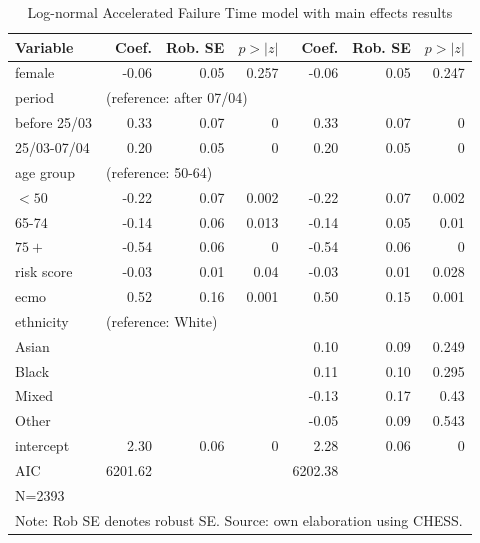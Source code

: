 \documentclass[review]{elsarticle}
\begin{document}
\begin{table}[htp]
\caption{Log-normal Accelerated Failure Time model with main effects results  \label{Table:ethnicity_model} }
\centering
\begin{tabular}{lrrr|rrr}\toprule
Variable	&	Coef.	&	Rob. SE	&			$p>|z|$	&	Coef.	&	Rob. SE	&			$p>|z|$	\\\toprule
     female	&	-0.06	&	0.05	&			0.257	&	-0.06	&	0.05	&			0.247	\\
           																	
period	&	\multicolumn{6}{l}{(reference: after 07/04)}															\\
before 25/03	&	0.33	&	0.07	&			0	&	0.33	&	0.07	&			0	\\
25/03-07/04	&	0.20	&	0.05	&			0	&	0.20	&	0.05	&			0	\\
																	
age group	&	\multicolumn{6}{l}{(reference: 50-64)}															\\
       $<50$ 	&	-0.22	&	0.07	&			0.002	&	-0.22	&	0.07	&			0.002	\\
     65-74 	&	-0.14	&	0.06	&			0.013	&	-0.14	&	0.05	&			0.01	\\
       $75+$ 	&	-0.54	&	0.06	&			0	&	-0.54	&	0.06	&			0	\\
risk score	&	-0.03	&	0.01	&			0.04	&	-0.03	&	0.01	&			0.028	\\
       ecmo	&	0.52	&	0.16	&			0.001	&	0.50	&	0.15	&			0.001	\\
																	
ethnicity	&	\multicolumn{6}{l}{(reference: White)}															\\
     Asian  	&		&		&				&	0.10	&	0.09	&			0.249	\\
     Black  	&		&		&				&	0.11	&	0.10	&			0.295	\\
     Mixed  	&		&		&				&	-0.13	&	0.17	&			0.43	\\
     Other  	&		&		&				&	-0.05	&	0.09	&			0.543	\\
intercept	&	2.30	&	0.06	&			0	&	2.28	&	0.06	&			0	\\\midrule
AIC	&	6201.62	&		&				&	6202.38	&		&				\\
N=2393& & & & & &\\\bottomrule

\multicolumn{7}{l}{Note: Rob SE denotes robust SE. Source: own elaboration using CHESS.}
\end{tabular}
 \end{table}


\newpage 


\end{document}
